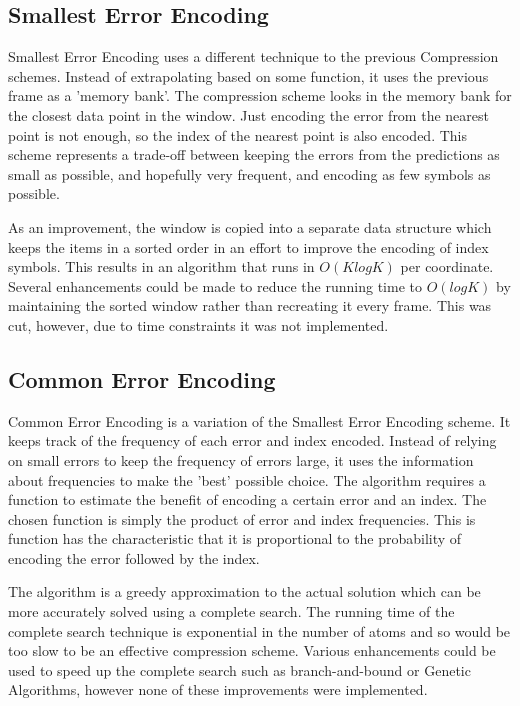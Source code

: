 \documentclass[a4paper,11pt]{report}
\begin{document}
\subsection{Smallest Error Encoding}

Smallest Error Encoding uses a different technique to the previous Compression schemes. Instead of extrapolating based on some function, it uses the previous frame as a 'memory bank'. The compression scheme looks in the memory bank for the closest data point in the window. Just encoding the error from the nearest point is not enough, so the index of the nearest point is also encoded. This scheme represents a trade-off between keeping the errors from the predictions as small as possible, and hopefully very frequent, and encoding as few symbols as possible.

As an improvement, the window is copied into a separate data structure which keeps the items in a sorted order in an effort to improve the encoding of index symbols. This results in an algorithm that runs in $O(KlogK)$ per coordinate. Several enhancements could be made to reduce the running time to $O(logK)$ by maintaining the sorted window rather than recreating it every frame. This was cut, however, due to time constraints it was not implemented.

\subsection{Common Error Encoding}

Common Error Encoding is a variation of the Smallest Error Encoding scheme. It keeps track of the frequency of each error and index encoded. Instead of relying on small errors to keep the frequency of errors large, it uses the information about frequencies to make the 'best' possible choice. The algorithm requires a function to estimate the benefit of encoding a certain error and an index. The chosen function is simply the product of error and index frequencies. This is function has the characteristic that it is proportional to the probability of encoding the error followed by the index.

The algorithm is a greedy approximation to the actual solution which can be more accurately solved using a complete search. The running time of the complete search technique is exponential in the number of atoms and so would be too slow to be an effective compression scheme. Various enhancements could be used to speed up the complete search such as branch-and-bound or Genetic Algorithms, however none of these improvements were implemented. 
\end{document}
